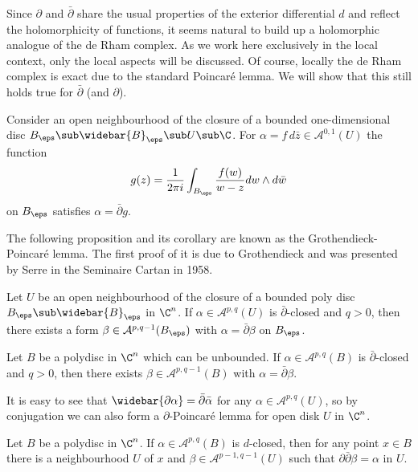 Since $\partial$ and $\bar{\partial}$ share the usual properties of the exterior differential $d$ and reflect the holomorphicity of functions, it seems natural to build up a holomorphic analogue of the de Rham complex. As we work here exclusively in the local context, only the local aspects will be discussed. Of course, locally the de Rham complex is exact due to the standard Poincar\'e lemma. We will show that this still holds true for $\bar{\partial}$ (and $\partial$).
\begin{proposition}
Consider an open neighbourhood of the closure of a bounded one-dimensional disc $B_\eps\sub\widebar{B}_\eps\sub U\sub\C$. For $\alpha=f\,d\bar{z}\in\mathcal{A}^{0,1}(U)$ the function
\[g(z)=\frac{1}{2\pi i}\int_{B_\eps}\frac{f(w)}{w-z}dw\wedge d\bar{w}\]
on $B_\eps$ satisfies $\alpha=\bar{\partial}g$.
\end{proposition}
The following proposition and its corollary are known as the Grothendieck-Poincar\'e lemma. The first proof of it is due to Grothendieck and was presented by Serre in the Seminaire Cartan in 1958.
\begin{proposition}
Let $U$ be an open neighbourhood of the closure of a bounded poly disc $B_\eps\sub\widebar{B}_\eps$ in $\C^n$. If $\alpha\in\mathcal{A}^{p,q}(U)$ is $\bar{\partial}$-closed and $q>0$, then there exists a form $\beta\in\mathcal{A}^{p,q-1}(B_\eps)$ with $\alpha=\bar{\partial}\beta$ on $B_\eps$.
\end{proposition}
\begin{corollary}
Let $B$ be a polydisc in $\C^n$ which can be unbounded. If $\alpha\in\mathcal{A}^{p,q}(B)$ is $\bar{\partial}$-closed and $q>0$, then there exists $\beta\in\mathcal{A}^{p,q-1}(B)$ with $\alpha=\bar{\partial}\beta$.
\end{corollary}
\begin{remark}
It is easy to see that $\widebar{\partial\alpha}=\bar{\partial}\bar{\alpha}$ for any $\alpha\in\mathcal{A}^{p,q}(U)$, so by conjugation we can also form a $\partial$-Poincar\'e lemma for open disk $U$ in $\C^n$.
\end{remark}
\begin{corollary}
Let $B$ be a polydisc in $\C^n$. If $\alpha\in\mathcal{A}^{p,q}(B)$ is $d$-closed, then for any point $x\in B$ there is a neighbourhood $U$ of $x$ and $\beta\in\mathcal{A}^{p-1,q-1}(U)$ such that $\partial\bar{\partial}\beta=\alpha$ in $U$. 
\end{corollary}
